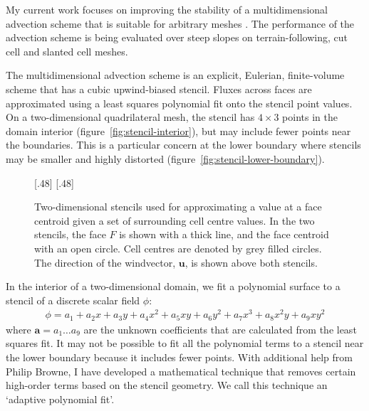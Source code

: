 \documentclass[a4paper,11pt]{article}
\begin{document}
My current work focuses on improving the stability of a multidimensional advection scheme that is suitable for arbitrary meshes \citep{weller-shahrokhi2014}.  The performance of the advection scheme is being evaluated over steep slopes on terrain-following, cut cell and slanted cell meshes.

The multidimensional advection scheme is an explicit, Eulerian, finite-volume scheme that has a cubic upwind-biased stencil.  Fluxes across faces are approximated using a least squares polynomial fit onto the stencil point values.
On a two-dimensional quadrilateral mesh, the stencil has $4 \times 3$ points in the domain interior (figure~\ref{fig:stencil-interior}), but may include fewer points near the boundaries.  This is a particular concern at the lower boundary where stencils may be smaller and highly distorted (figure~\ref{fig:stencil-lower-boundary}).

\begin{figure}
	\centering
	[.48\linewidth]{}
	[.48\linewidth]{\vspace*{2em}}
	\caption{Two-dimensional stencils used for approximating a value at a face centroid given a set of surrounding cell centre values.  In the two stencils, the face $F$ is shown with a thick line, and the face centroid with an open circle. Cell centres are denoted by grey filled circles.  The direction of the windvector, $\bm{u}$, is shown above both stencils.}
	\label{fig:stencils}
\end{figure}

In the interior of a two-dimensional domain, we fit a polynomial surface to a stencil of a discrete scalar field $\phi$:
\begin{align}
	\phi = a_1 + a_2 x + a_3 y + a_4 x^2 + a_5 x y + a_6 y^2 + a_7 x^3 + a_8 x^2 y + a_9 x y^2 \label{eqn:polynomial}
\end{align}
where $\bm{a} = a_1 \ldots a_9$ are the unknown coefficients that are calculated from the least squares fit.  It may not be possible to fit all the polynomial terms to a stencil near the lower boundary because it includes fewer points.  With additional help from Philip Browne, I have developed a mathematical technique that removes certain high-order terms based on the stencil geometry.  We call this technique an `adaptive polynomial fit'.
\end{document}
